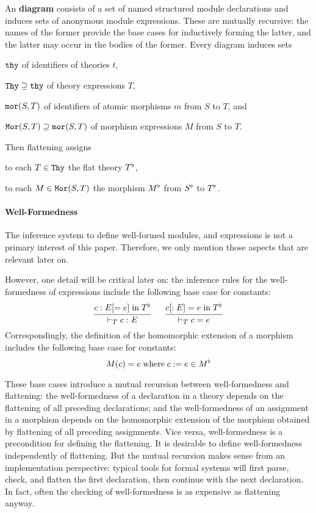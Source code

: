 An \mmt \textbf{diagram} consists of a set of named structured module declarations and induces sets of anonymous module expressions.
These are mutually recursive: the names of the former provide the base cases for inductively forming the latter, and the latter may occur in the bodies of the former.
Every diagram induces sets
\begin{compactitem}
 \item $\mathtt{thy}$ of identifiers of theories $t$,
 \item $\mathtt{Thy}\supseteq \mathtt{thy}$ of theory expressions $T$,
 \item $\mathtt{mor}(S,T)$ of identifiers of atomic morphisms $m$ from $S$ to $T$, and
 \item $\mathtt{Mor}(S,T)\supseteq\mathtt{mor}(S,T)$ of morphism expressions $M$ from $S$ to $T$.
\end{compactitem}
Then flattening assigns
\begin{compactitem}
 \item to each $T\in\mathtt{Thy}$ the flat theory $T^\flat$,
 \item to each $M\in\mathtt{Mor}(S,T)$ the morphism $M^\flat$ from $S^\flat$ to $T^\flat$.
\end{compactitem}

\paragraph{Well-Formedness}
The inference system to define well-formed modules, and expressions is not a primary interest of this paper.
Therefore, we only mention those aspects that are relevant later on.

However, one detail will be critical later on:
the inference rules for the well-formedness of expressions include the following base case for constants:
\[\cfrac{c:E[=e] \;\mathrm{in}\; T^\flat}{\vdash_T c:E}\, \hspace*{.5cm} \cfrac{c[:E]=e \;\mathrm{in}\; T^\flat}{\vdash_T c=e}\,\]
Correspondingly, the definition of the homomorphic extension of a morphism includes the following base case for constants:
\[M(c) = e \;\mathrm{where}\; c:= e\in M^\flat\]

These base cases introduce a mutual recursion between well-formedness and flattening:
the well-formedness of a declaration in a theory depends on the flattening of all preceding declarations;
and the well-formedness of an assignment in a morphism depends on the homomorphic extension of the morphism obtained by flattening of all preceding assignments.
Vice versa, well-formedness is a precondition for defining the flattening.
It is desirable to define well-formedness independently of flattening.
But the mutual recursion makes sense from an implementation perspective: typical tools for formal systems will first parse, check, and flatten the first declaration, then continue with the next declaration.
In fact, often the checking of well-formedness is as expensive as flattening anyway.

